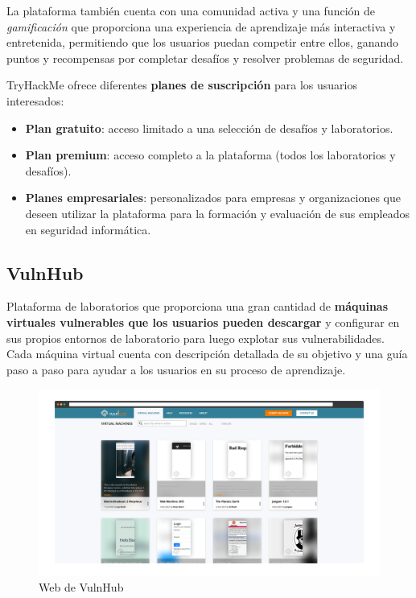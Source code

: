             La plataforma también cuenta con una comunidad activa y una función de \textit{gamificación} que proporciona una experiencia de aprendizaje más interactiva y entretenida, permitiendo que los usuarios puedan competir entre ellos, ganando puntos y recompensas por completar desafíos y resolver problemas de seguridad.
            
            TryHackMe ofrece diferentes \textbf{planes de suscripción} para los usuarios interesados:
            
            \begin{itemize}
                \item \textbf{Plan gratuito}: acceso limitado a una selección de desafíos y laboratorios.
            
                \item \textbf{Plan premium}: acceso completo a la plataforma (todos los laboratorios y desafíos).
            
                \item \textbf{Planes empresariales}: personalizados para empresas y organizaciones que deseen utilizar la plataforma para la formación y evaluación de sus empleados en seguridad informática.
            \end{itemize}
            
            \newpage
        
        
        \subsection{VulnHub}
        
            Plataforma de laboratorios que proporciona una gran cantidad de \textbf{máquinas virtuales vulnerables que los usuarios pueden descargar} y configurar en sus propios entornos de laboratorio para luego explotar sus vulnerabilidades. Cada máquina virtual cuenta con descripción detallada de su objetivo y una guía paso a paso para ayudar a los usuarios en su proceso de aprendizaje.
            
            \begin{figure}[h]
                \centering

                \includegraphics[width=\textwidth]{images/Capturas/Web de VulnHub.png}

                \caption{Web de VulnHub}
                \label{fig:VulnHub-web}
            \end{figure}
            

